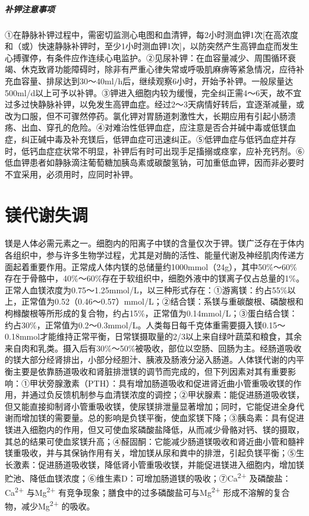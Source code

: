 \paragraph{补钾注意事项}

①在静脉补钾过程中，需密切监测心电图和血清钾，每2小时测血钾1次{[}在高浓度和（或）快速静脉补钾时，至少1小时测血钾1次{]}，以防突然产生高钾血症而发生心搏骤停，有条件应作连续心电监护。②见尿补钾：在血容量减少、周围循环衰竭、休克致肾功能障碍时，除非有严重心律失常或呼吸肌麻痹等紧急情况，应待补充血容量、排尿达到30～40ml/h后，继续观察6小时，开始予补钾。一般尿量达500ml/d以上可予以补钾。③钾进入细胞内较为缓慢，完全纠正需4～6天，故不宜过多过快静脉补钾，以免发生高钾血症。经过2～3天病情好转后，宜逐渐减量，或改为口服，但不可骤然停药。氯化钾对胃肠道刺激性大，长期应用有引起小肠溃疡、出血、穿孔的危险。④对难治性低钾血症，应注意是否合并碱中毒或低镁血症，纠正碱中毒及补充镁后，低钾血症可迅速纠正。⑤低钾血症与低钙血症并存时，低钙血症症状常不明显，补钾后有时可出现手足搐搦或痉挛，应补充钙剂。⑥低血钾患者如静脉滴注葡萄糖加胰岛素或碳酸氢钠，可加重低血钾，因而非必要时不宜采用，必须用时，应同时补钾。

\protect\hypertarget{text00197.html}{}{}

\chapter{镁代谢失调}

镁是人体必需元素之一。细胞内的阳离子中镁的含量仅次于钾。镁广泛存在于体内各组织中，参与许多生物学过程，尤其是对酶的活性、能量代谢及神经肌肉传递方面起着重要作用。正常成人体内镁的总储量约1000mmol（24g），其中50\%～60\%存在于骨骼中，40\%～60\%存在于软组织中，细胞外液中的镁离子仅占总量的1\%。正常人血镁浓度为0.75～1.25mmol/L，以三种形式存在：①游离镁：约占55\%以上，正常值为0.52（0.46～0.57）mmol/L；②结合镁：系镁与重碳酸根、磷酸根和枸橼酸根等所形成的复合物，约占15\%，正常值为0.14mmol/L；③蛋白结合镁：约占30\%，正常值为0.2～0.3mmol/L。人类每日每千克体重需要摄入镁0.15～0.18mmol才能维持正常平衡，日常镁摄取量的2/3以上来自绿叶蔬菜和粮食，其余来自肉和乳类。摄入后有30\%～50\%被吸收，部位以空肠、回肠为主。经肠道吸收的镁大部分经肾排出，小部分经胆汁、胰液及肠液分泌入肠道。人体镁代谢的内平衡主要是依靠肠道吸收和肾脏排泄镁的调节而完成的，但下列因素对其有重要影响：①甲状旁腺激素（PTH）：具有增加肠道吸收和促进肾近曲小管重吸收镁的作用，并通过负反馈机制参与血清镁浓度的调控；②甲状腺素：能促进肠道吸收镁，但又能直接抑制肾小管重吸收镁，使尿镁排泄量显著增加；同时，它能促进全身代谢而增加镁的需要量。总的影响是负镁平衡，使血浆镁下降；③胰岛素：具有促进镁进入细胞内的作用，但又可使血浆磷酸盐降低，从而减少骨骼对钙、镁的摄取，其总的结果可使血浆镁升高；④醛固酮：它能减少肠道镁吸收和肾近曲小管和髓袢镁重吸收，并与其保钠作用有关，增加镁从尿和粪中的排泄，引起负镁平衡；⑤生长激素：促进肠道吸收镁，降低肾小管重吸收镁，并能促进镁进入细胞内，增加镁贮池、降低血镁浓度；⑥维生素D：可增加肠道镁的吸收；⑦Ca\textsuperscript{2+}
及磷酸盐：Ca\textsuperscript{2+} 与Mg\textsuperscript{2+}
有竞争现象；膳食中的过多磷酸盐可与Mg\textsuperscript{2+}
形成不溶解的复合物，减少Mg\textsuperscript{2+} 的吸收。

